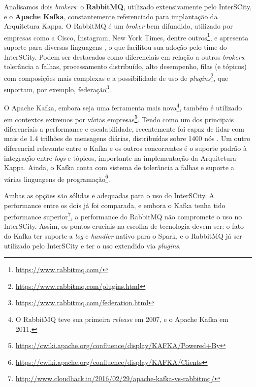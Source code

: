 Analisamos dois \textit{brokers}: o \textbf{RabbitMQ}, utilizado
extensivamente pelo InterSCity, e o \textbf{Apache Kafka}, constantemente
referenciado para implantação da Arquitetura Kappa. O RabbitMQ é um
\textit{broker} bem difundido, utilizado por empresas como a Cisco, Instagram,
New York Times, dentre outros\footnote{\url{https://www.rabbitmq.com/}},
e apresenta suporte para diversas linguagens \cite{zaitsev2014}, o que
facilitou sua adoção pelo time do InterSCity. Podem ser destacados como
diferenciais em relação a outros \textit{brokers}: tolerância a falhas,
processamento distribuído, alto desempenho, filas (e tópicos) com composições
mais complexas e a possibilidade de uso de
\textit{plugins}\footnote{\url{https://www.rabbitmq.com/plugins.html}},
que suportam, por exemplo,
federação\footnote{\url{https://www.rabbitmq.com/federation.html}}.

O Apache Kafka, embora seja uma ferramenta mais nova\footnote{O RabbitMQ teve
sua primeira \textit{release} em 2007, e o Apache Kafka em 2011.}, também é
utilizado em contextos extremos por várias
empresas\footnote{\url{https://cwiki.apache.org/confluence/display/KAFKA/Powered+By}}.
Tendo como um dos principais diferenciais a performance e escalabilidade,
recentemente foi capaz de lidar com mais de 1.4 trilhões de mensagens diárias,
distribuídas sobre 1400 nós \cite{koshy2016}. Um outro diferencial relevante
entre o Kafka e os outros concorrentes é o suporte padrão à integração entre
\textit{logs} e tópicos, importante na implementação da Arquitetura Kappa. Ainda,
o Kafka conta com sistema de tolerância a falhas e suporte a várias linguagens de
programação\footnote{\url{https://cwiki.apache.org/confluence/display/KAFKA/Clients}}.

Ambas as opções são sólidas e adequadas para o uso do InterSCity. A
performance entre os dois já foi comparada, e embora o Kafka tenha tido
performance
superior\footnote{\url{http://www.cloudhack.in/2016/02/29/apache-kafka-vs-rabbitmq/}},
a performance do RabbitMQ não compromete o uso no InterSCity. Assim, os pontos
cruciais na escolha de tecnologia devem ser: o fato do Kafka ter suporte a
\textit{log} e \textit{handler} nativo para o Spark, e o RabbitMQ já ser
utilizado pelo InterSCity e ter o uso extendido via \textit{plugins}.


